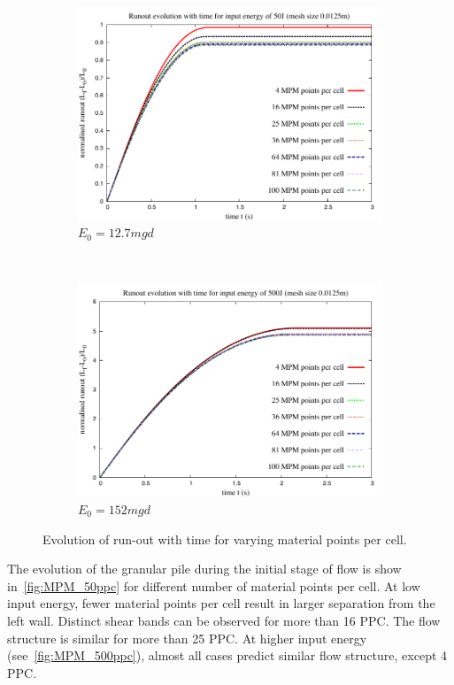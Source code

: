 \begin{figure}[tbhp]
\centering
\begin{subfigure}[b]{0.95\textwidth}
\includegraphics[width=\textwidth]{Runout_50}
\caption{$E_0=12.7mgd$}
\label{fig:Runout_50}
\end{subfigure}
\\
\begin{subfigure}[b]{0.95\textwidth}
\centering
\includegraphics[width=\textwidth]{Runout_500}
\caption{$E_0=152mgd$}
\label{fig:Runout_500}
\end{subfigure}
\caption{Evolution of run-out with time for varying material points per cell.}
\label{fig:Runout_MPM}
\end{figure}

The evolution of the granular pile during the initial stage of flow is show 
in~\cref{fig:MPM_50ppc} for different number of material points per cell. At 
low input energy, fewer material points per cell result in larger separation 
from the left wall. Distinct shear bands can be observed for more than 16 PPC. 
The flow structure is similar for more than 25 PPC. At higher input energy 
(see~\cref{fig:MPM_500ppc}), almost all cases predict similar flow structure, 
except 4 PPC.

